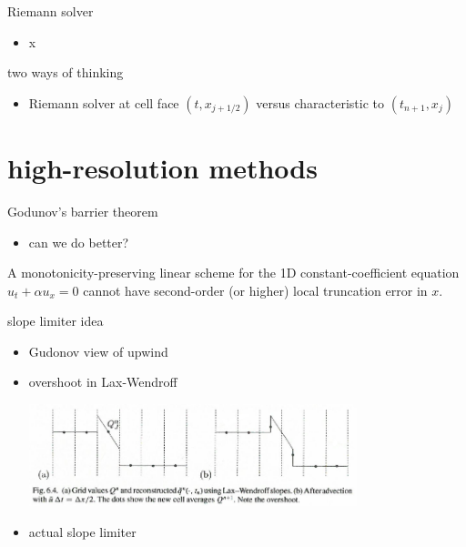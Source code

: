\documentclass[10pt,hyperref]{beamer}
\begin{document}
\begin{frame}{Riemann solver}

\begin{itemize}
\item x
\end{itemize}
\end{frame}


\begin{frame}{two ways of thinking}

\begin{itemize}
\item Riemann solver at cell face $(t,x_{j+1/2})$ versus characteristic to $(t_{n+1},x_j)$
\end{itemize}
\end{frame}



\section{high-resolution methods}

\begin{frame}{Godunov's barrier theorem}

\begin{itemize}
\item can we do better?
\end{itemize}

\begin{theorem}  A monotonicity-preserving linear scheme for the 1D constant-coefficient equation $u_t + \alpha u_x=0$ cannot have second-order (or higher) local truncation error in $x$.\end{theorem}
\end{frame}


\begin{frame}{slope limiter idea}

\begin{itemize}
\item Gudonov view of upwind
\item overshoot in Lax-Wendroff

\hfill \includegraphics[width=0.75\textwidth]{figs/leveque6p4}
\item actual slope limiter
\end{itemize}
\end{frame}
\end{document}
